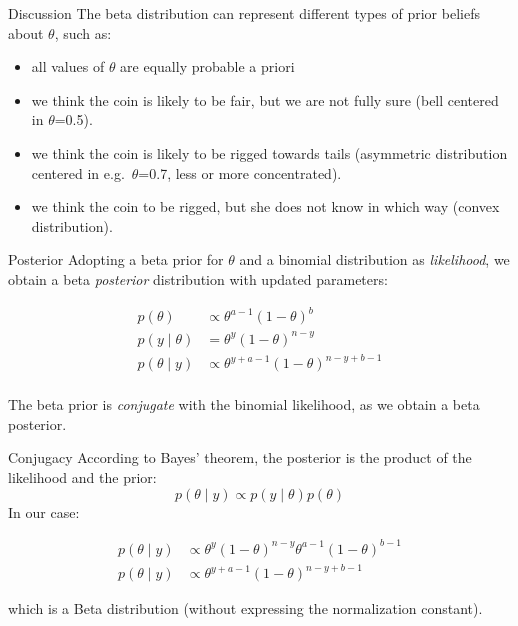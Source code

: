 \documentclass[
  13pt,
  ignorenonframetext,
]{beamer}
\providecommand{\tightlist}{%
  \setlength{\itemsep}{0pt}\setlength{\parskip}{0pt}}
\begin{document}
\begin{frame}{Discussion}
\protect\hypertarget{discussion}{}
The beta distribution can represent different types of prior beliefs\\
about \(\theta\), such as:

\begin{itemize}
\tightlist
\item
  all values of \(\theta\) are equally probable a priori
\item
  we think the coin is likely to be fair, but we are not fully sure
  (bell centered in \(\theta\)=0.5).
\item
  we think the coin is likely to be rigged towards tails (asymmetric
  distribution centered in e.g.~\(\theta\)=0.7, less or more
  concentrated).
\item
  we think the coin to be rigged, but she does not know in which way
  (convex distribution).
\end{itemize}
\end{frame}

\begin{frame}{Posterior}
\protect\hypertarget{posterior}{}
Adopting a beta prior for \(\theta\) and a binomial distribution as
\emph{likelihood}, we obtain a beta \emph{posterior} distribution with
updated parameters:

\begin{align*}
p(\theta) & \propto \theta^{a-1} (1-\theta)^{b}\\
p(y \mid \theta) & = \theta^{y} (1-\theta)^{n-y} \\
p(\theta \mid y) & \propto  \theta^{y+a-1} (1-\theta)^{n-y+b-1}\\
\end{align*}

The beta prior is \emph{conjugate} with the binomial likelihood, as we
obtain a beta posterior.
\end{frame}

\begin{frame}{Conjugacy}
\protect\hypertarget{conjugacy}{}
According to Bayes' theorem, the posterior is the product of the
likelihood and the prior: \[
p(\theta \mid y) \propto p(y \mid \theta) p(\theta)
\] In our case:

\begin{align*}
p(\theta \mid y) & \propto \theta^y (1-\theta)^{n-y}
\theta^{a-1} (1-\theta)^{b-1}\\
p(\theta \mid y) & \propto \theta^{y+a-1} (1-\theta)^{n-y+b-1}
\end{align*}

which is a Beta distribution (without expressing the normalization
constant).
\end{frame}
\end{document}
